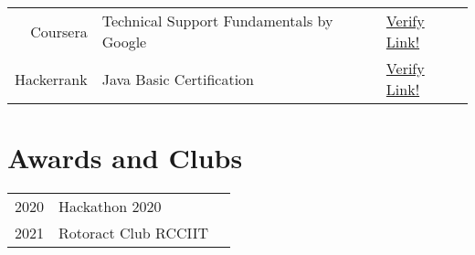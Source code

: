 \documentclass[letterpaper]{deedy-resume}
\begin{document}
\begin{minipage}[t]{0.66\textwidth}
\begin{tabular}{rll}
Coursera & Technical Support Fundamentals by Google & \href{https://coursera.org/share/3226e077a4cf172b94749c8cf1ec5011}{ Verify Link!}\\
Hackerrank & Java Basic Certification & \href{https://coursera.org/share/3226e077a4cf172b94749c8cf1ec5011}{ Verify Link!}\\
\end{tabular}



\section{Awards and Clubs} 
\begin{tabular}{rll}
2020& Hackathon 2020\\
2021 &Rotoract Club RCCIIT\\
\end{tabular}
\sectionsep


\end{minipage} 
\hfill
%
%
\end{document}
